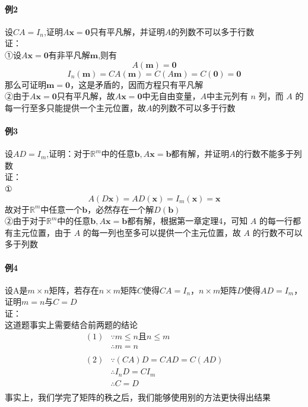 \documentclass{article}
\newcommand{\ve}{\boldsymbol}
\begin{document}
\begin{CJK}{UTF8}{gkai}
\paragraph{例2\\}
设$CA=I_n$,证明$A\ve{x}=\ve{0}$只有平凡解，并证明$A$的列数不可以多于行数\\

证：\\
①设$A\ve{x}=\ve{0}$有非平凡解$\ve{m}$,则有
\[A(\ve{m})=\ve{0}\]
\[I_n(\ve{m})=CA(\ve{m})=C(A\ve{m})=C(\ve{0})=\ve{0}\]
那么可证明$\ve{m}=\ve{0}$，这是矛盾的，因而方程只有平凡解\\

②由于$A\ve{x}=\ve{0}$只有平凡解，故$A\ve{x}=\ve{0}$中无自由变量，$A$中主元列有 $n$ 列，而 $A$ 的每一行至多只能提供一个主元位置，故$A$的列数不可以多于行数\\
\paragraph{例3\\}
设$AD=I_m$,证明：对于$\mathbb{R}^m$中的任意$\ve{b},A\ve{x}=\ve{b}$都有解，并证明$A$的行数不能多于列数\\

证：\\
①\[A(D\ve{x})=AD(\ve{x})=I_m(\ve{x})=\ve{x}\]
故对于$\mathbb{R}^m$中任意一个$\ve{b}$，必然存在一个解$D(\ve{b})$\\

②由于对于$\mathbb{R}^m$中的任意$\ve{b},A\ve{x}=\ve{b}$都有解，根据第一章定理4，可知 $A$ 的每一行都有主元位置，由于 $A$ 的每一列也至多可以提供一个主元位置，故 $A$ 的行数不可以多于列数\\
\paragraph{例4\\}
设A是$m\times n$矩阵，若存在$n\times m$矩阵$C$使得$CA=I_n$，$n\times m$矩阵$D$使得$AD=I_m$，证明$m=n$与$C=D$\\

证：\\
这道题事实上需要结合前两题的结论\\
\[
\begin{aligned}    
(1)&\because m\leq n \text{且} n \leq m\\
&\therefore m = n\\
&\\
(2)&\because(CA)D=CAD=C(AD)\\
&\therefore I_n D=C I_m\\
&\therefore C=D\\
\end{aligned}
\]
事实上，我们学完了矩阵的秩之后，我们能够使用别的方法更快得出结果\\


\end{CJK}
\end{document}
